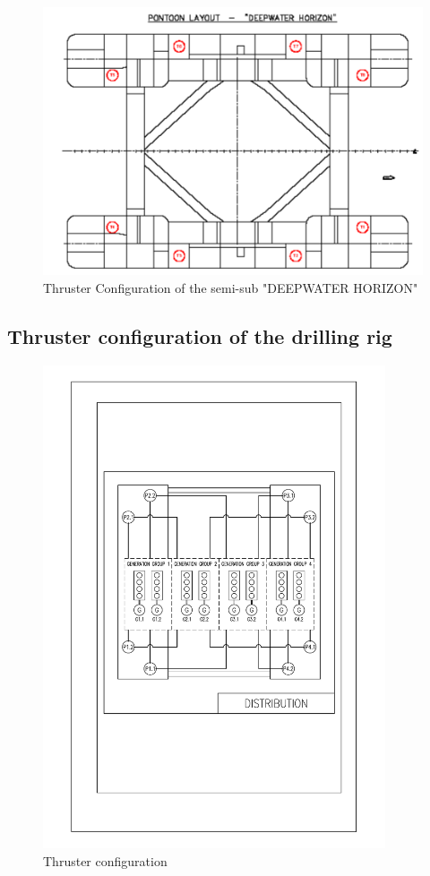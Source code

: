 \begin{figure}[h!]
    \centering
    \includegraphics[width = \textwidth ]{figures/PP_ThrusterConfig.png}
    \caption{Thruster Configuration of the semi-sub "DEEPWATER HORIZON" \cite{LectureNote11PowerSystemDesign}}
    \label{fig:PP_ThrusterConfigDeepwaterHorizon}
\end{figure}

\newpage
\subsection{Thruster configuration of the drilling rig} \label{app:thrusterConfig}
\begin{figure}[h]
    \centering
    \includegraphics[width = 0.9\textwidth]{figures/Single_Line_distribution.pdf}
    \caption{Thruster configuration}
    \label{fig:SingleLineDistribution}
\end{figure}

